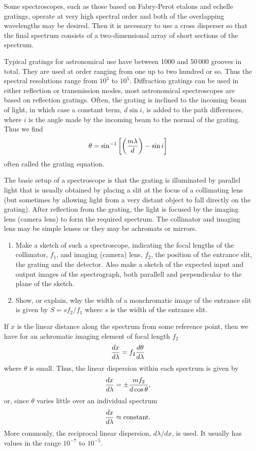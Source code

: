 Some spectroscopes, such as those based on Fabry-Perot etalons and echelle gratings, 
operate at very high spectral order and both of the overlapping wavelengths may be
desired. Then it is necessary to use a cross disperser so that the final spectrum 
consists of a two-dimensional array of short sections of the spectrum.

Typical gratings for astronomical use have between 1000 and $50\,000$ grooves in total.
They are used at order ranging from one up to two hundred or so. Thus the spectral 
resolutions range from $10^3$ to $10^5$. Diffraction gratings can be used in either 
reflection or transmission modes, most astronomical spectroscopes are based on reflection gratings. Often, the grating is inclined to the incoming beam of light, in which
case a constant term, $d\sin i$, is added to the path differences, where $i$ is the angle
made by the incoming beam to the normal of the grating. Thus we find
\[
\theta=\sin^{-1}\left[\left({m\lambda\over d}\right)-\sin i\right]
\]
often called the grating equation.

The basic setup of a spectroscope is that the grating is illuminated by parallel light
that is usually obtained by placing a slit at the focus of a collimating lens (but sometimes by allowing light from a very distant object to fall directly on the grating).
After reflection from the grating, the light is focused by the imaging lens (camera lens)
to form the required spectrum. The collimator and imaging lens may be simple lenses or they may be achromats or mirrors.

\begin{enumerate}
\setcounter{enumi}{\value{count}}
\item Make a sketch of such a spectroscope, indicating the focal lengths
of the collimator, $f_1$, and imaging (camera) lens, $f_2$, the position of
the entrance slit, the grating and the detector. Also make a sketch
of the expected input and output images of the spectrograph, both
parallell and perpendicular to the plane of the sketch.
\item Show, or explain, why the width of a monchromatic image of the
  entrance slit is given by $S={sf_2/f_1}$ where $s$ is the width of
  the entrance slit.
\setcounter{count}{\value{enumi}} 
\end{enumerate}

If $x$ is the linear distance along the spectrum from some reference point, then we have
for an achromatic imaging element of focal length $f_2$
\[
{dx\over d\lambda}=f_2{d\theta\over d\lambda}
\]
where $\theta$ is small. Thus, the linear dispersion within each spectrum is given by
\[
{dx\over d\lambda}=\pm{mf_2\over d\cos\theta},
\]
or, since $\theta$ varies little over an individual spectrum
\[
{dx\over d\lambda}\approx {\rm constant}.
\]
More commonly, the reciprocal linear dispersion, ${d\lambda/dx}$, is used. It usually 
has values in the range $10^{-7}$ to $10^{-5}$.

